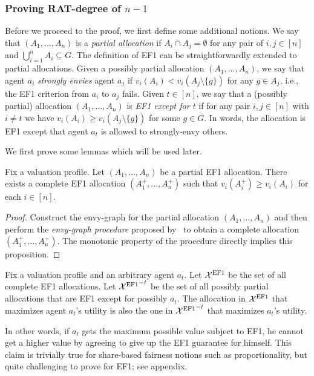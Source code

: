 \subsubsection{Proving RAT-degree of $n-1$}
Before we proceed to the proof, we first define some additional notions.
We say that $(A_1,\ldots,A_n)$ is a \emph{partial allocation} if $A_i\cap A_j=\emptyset$ for any pair of $i,j\in[n]$ and $\bigcup_{i=1}^nA_i\subseteq G$.
The definition of EF1 can be straightforwardly extended to partial allocations.
Given a possibly partial allocation $(A_1,\ldots,A_n)$, we say that agent $a_i$ \emph{strongly envies} agent $a_j$ if $v_i(A_i)<v_i(A_j\setminus\{g\})$ for any $g\in A_j$, i.e., the EF1 criterion from $a_i$ to $a_j$ fails.
Given $t \in[n]$, we say that a (possibly partial) allocation $(A_1,\ldots,A_n)$ is \emph{EF1 except for $t$} if for any pair $i,j\in[n]$ with $i\neq t$ we have $v_i(A_i)\geq v_i(A_j\setminus \{g\})$ for some $g\in G$.
In words, the allocation is EF1 except that agent $a_t$ is allowed to strongly-envy others.

We first prove some lemmas which will be used later.
\begin{lemma}\label{prop:partialtocomplete}
    Fix a valuation profile. Let $(A_1,\ldots,A_n)$ be a partial EF1 allocation. There exists a complete EF1 allocation $(A_1^+,\ldots,A_n^+)$ such that $v_i(A_i^+)\geq v_i(A_i)$ for each $i\in [n]$.
\end{lemma}
\begin{proof}
    Construct the envy-graph for the partial allocation $(A_1,\ldots,A_n)$ and then perform the \emph{envy-graph procedure} proposed by~\citet{lipton2004approximately} to obtain a complete allocation $(A_1^+,\ldots,A_n^+)$.
    The monotonic property of the procedure directly implies this proposition.
\end{proof}

\begin{lemmarep}\label{prop:maximuminexception}
    Fix a valuation profile and an arbitrary agent $a_{t}$. Let $\mathcal{X}^{\mathrm{EF1}}$ be the set of all complete EF1 allocations. Let ${\mathcal{X}^{\mathrm{EF1}}}^{-t}$ be the set of all possibly partial allocations that are EF1 except for possibly $a_t$. The allocation in $\mathcal{X}^{\mathrm{EF1}}$ that maximizes agent $a_t$'s utility is also the one in ${\mathcal{X}^{\mathrm{EF1}}}^{-t}$ that maximizes $a_t$'s utility.
\end{lemmarep}
In other words, if $a_t$ gets the maximum possible value subject to EF1, he cannot get a higher value by agreeing to give up the EF1 guarantee for himself.
This claim is trivially true for share-based fairness notions such as proportionality, but quite challenging to prove for EF1; see appendix.

